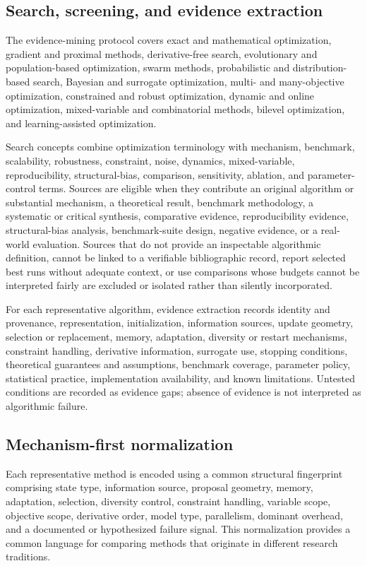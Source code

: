 \subsection{Search, screening, and evidence extraction}

The evidence-mining protocol covers exact and mathematical optimization, gradient and proximal methods, derivative-free search, evolutionary and population-based optimization, swarm methods, probabilistic and distribution-based search, Bayesian and surrogate optimization, multi- and many-objective optimization, constrained and robust optimization, dynamic and online optimization, mixed-variable and combinatorial methods, bilevel optimization, and learning-assisted optimization.

Search concepts combine optimization terminology with mechanism, benchmark, scalability, robustness, constraint, noise, dynamics, mixed-variable, reproducibility, structural-bias, comparison, sensitivity, ablation, and parameter-control terms. Sources are eligible when they contribute an original algorithm or substantial mechanism, a theoretical result, benchmark methodology, a systematic or critical synthesis, comparative evidence, reproducibility evidence, structural-bias analysis, benchmark-suite design, negative evidence, or a real-world evaluation. Sources that do not provide an inspectable algorithmic definition, cannot be linked to a verifiable bibliographic record, report selected best runs without adequate context, or use comparisons whose budgets cannot be interpreted fairly are excluded or isolated rather than silently incorporated.

For each representative algorithm, evidence extraction records identity and provenance, representation, initialization, information sources, update geometry, selection or replacement, memory, adaptation, diversity or restart mechanisms, constraint handling, derivative information, surrogate use, stopping conditions, theoretical guarantees and assumptions, benchmark coverage, parameter policy, statistical practice, implementation availability, and known limitations. Untested conditions are recorded as evidence gaps; absence of evidence is not interpreted as algorithmic failure.

\subsection{Mechanism-first normalization}

Each representative method is encoded using a common structural fingerprint comprising state type, information source, proposal geometry, memory, adaptation, selection, diversity control, constraint handling, variable scope, objective scope, derivative order, model type, parallelism, dominant overhead, and a documented or hypothesized failure signal. This normalization provides a common language for comparing methods that originate in different research traditions.

